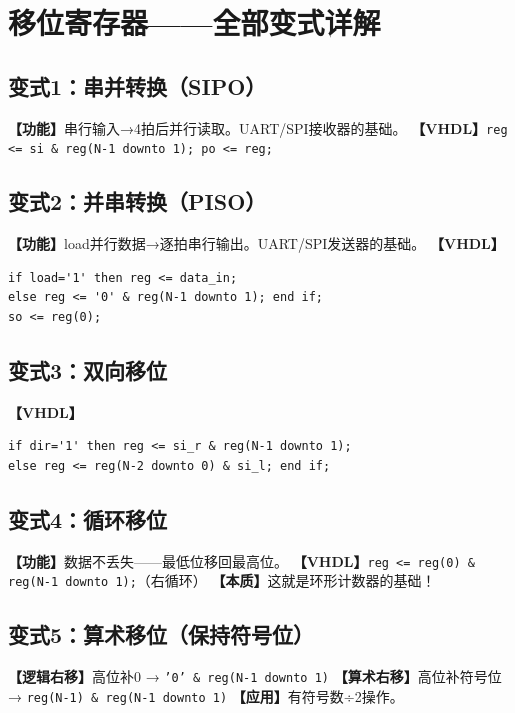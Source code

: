 \chapter{移位寄存器——全部变式详解}

\section{变式1：串并转换（SIPO）}

\begin{detailbox}[完整教学]
\textbf{【功能】}串行输入→4拍后并行读取。UART/SPI接收器的基础。
\textbf{【VHDL】}\texttt{reg <= si \& reg(N-1 downto 1); po <= reg;}
\end{detailbox}


\section{变式2：并串转换（PISO）}

\begin{detailbox}[完整教学]
\textbf{【功能】}load并行数据→逐拍串行输出。UART/SPI发送器的基础。
\textbf{【VHDL】}
\begin{lstlisting}
if load='1' then reg <= data_in;
else reg <= '0' & reg(N-1 downto 1); end if;
so <= reg(0);
\end{lstlisting}
\end{detailbox}


\section{变式3：双向移位}

\begin{detailbox}[完整教学]
\textbf{【VHDL】}
\begin{lstlisting}
if dir='1' then reg <= si_r & reg(N-1 downto 1);
else reg <= reg(N-2 downto 0) & si_l; end if;
\end{lstlisting}
\end{detailbox}


\section{变式4：循环移位}

\begin{detailbox}[完整教学]
\textbf{【功能】}数据不丢失——最低位移回最高位。
\textbf{【VHDL】}\texttt{reg <= reg(0) \& reg(N-1 downto 1);}（右循环）
\textbf{【本质】}这就是环形计数器的基础！
\end{detailbox}


\section{变式5：算术移位（保持符号位）}

\begin{detailbox}[完整教学]
\textbf{【逻辑右移】}高位补0 → \texttt{'0' \& reg(N-1 downto 1)}
\textbf{【算术右移】}高位补符号位 → \texttt{reg(N-1) \& reg(N-1 downto 1)}
\textbf{【应用】}有符号数÷2操作。
\end{detailbox}
